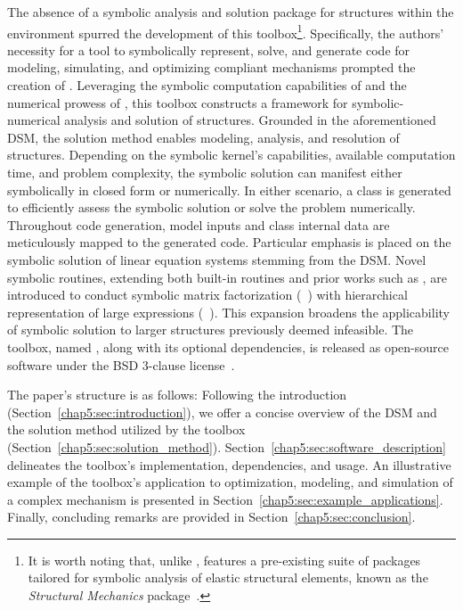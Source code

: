 The absence of a symbolic analysis and solution package for structures within the \Maple{} environment spurred the development of this toolbox\footnote{It is worth noting that, unlike \Maple{}, \Mathematica{} features a pre-existing suite of packages tailored for symbolic analysis of elastic structural elements, known as the \emph{Structural Mechanics} package~\cite{structuralmechanics}.}. Specifically, the authors' necessity for a tool to symbolically represent, solve, and generate code for modeling, simulating, and optimizing compliant mechanisms prompted the creation of \TrussMe{}. Leveraging the symbolic computation capabilities of \Maple{} and the numerical prowess of \Matlab{}, this toolbox constructs a framework for symbolic-numerical analysis and solution of structures. Grounded in the aforementioned \ac{DSM}, the solution method enables modeling, analysis, and resolution of structures. Depending on the symbolic kernel's capabilities, available computation time, and problem complexity, the symbolic solution can manifest either symbolically in closed form or numerically. In either scenario, a \Matlab{} class is generated to efficiently assess the symbolic solution or solve the problem numerically. Throughout code generation, model inputs and class internal data are meticulously mapped to the generated code. Particular emphasis is placed on the symbolic solution of linear equation systems stemming from the \ac{DSM}. Novel symbolic routines, extending both built-in \Maple{} routines and prior works such as \cite{carette2006linear, zhou2007symbolic}, are introduced to conduct symbolic matrix factorization (\LAST{}~\cite{last}) with hierarchical representation of large expressions (\LEM{}~\cite{lem}). This expansion broadens the applicability of symbolic solution to larger structures previously deemed infeasible. The toolbox, named \TrussMe{}, along with its optional dependencies, is released as open-source software under the BSD 3-clause license~\cite{trussme}.

The paper's structure is as follows: Following the introduction (Section~\ref{chap5:sec:introduction}), we offer a concise overview of the \ac{DSM} and the solution method utilized by the toolbox (Section~\ref{chap5:sec:solution_method}). Section~\ref{chap5:sec:software_description} delineates the toolbox's implementation, dependencies, and usage. An illustrative example of the toolbox's application to optimization, modeling, and simulation of a complex mechanism is presented in Section~\ref{chap5:sec:example_applications}. Finally, concluding remarks are provided in Section~\ref{chap5:sec:conclusion}.

